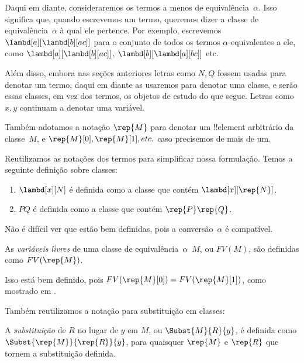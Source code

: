\documentclass[../../../include/open-logic-section]{subfiles}
\begin{document}

Daqui em diante, consideraremos os termos a menos de equivalência~$\alpha$.
Isso significa que, quando escrevemos um termo, queremos dizer a classe de
equivalência~$\alpha$ à qual ele pertence. Por exemplo, escrevemos
$\lambd[a][\lambd[b][a c]]$ para o conjunto de todos os termos
$\alpha$-equivalentes a ele, como $\lambd[a][\lambd[b][a c]]$,
$\lambd[b][\lambd[a][b c]]$ etc.

Além disso, embora nas seções anteriores letras como $N, Q$ fossem usadas
para denotar um termo, daqui em diante as usaremos para denotar uma classe, e
serão essas classes, em vez dos termos, os objetos de estudo do que segue.
Letras como $x, y$ continuam a denotar uma variável.

Também adotamos a notação $\rep{M}$ para denotar um !!{element} arbitrário da
classe~$M$, e $\rep{M}[0], \rep{M}[1], etc. $ caso precisemos de mais de um.

Reutilizamos as notações dos termos para simplificar nossa formulação. Temos
a seguinte definição sobre classes:
\begin{defn}
  \begin{enumerate}
  \item $\lambd[x][N]$ é definida como a classe que contém
    $\lambd[x][\rep{N}]$.
  \item $PQ$ é definida como a classe que contém $\rep{P}\rep{Q}$.
  \end{enumerate}
\end{defn}

Não é difícil ver que estão bem definidas, pois a conversão~$\alpha$ é
compatível.

\begin{defn} 
  As \emph{variáveis livres} de uma classe de equivalência~$\alpha$~$M$, ou
  $FV(M)$, são definidas como $FV(\rep{M})$.
\end{defn}

Isso está bem definido, pois $FV(\rep{M}[0]) = FV(\rep{M}[1])$, como mostrado
em .

Também reutilizamos a notação para substituição em classes:
\begin{defn} 
  A \emph{substituição} de $R$ no lugar de $y$ em $M$, ou $\Subst{M}{R}{y}$, é
  definida como $\Subst{\rep{M}}{\rep{R}}{y}$, para quaisquer $\rep{M}$ e
  $\rep{R}$ que tornem a substituição definida.
\end{defn}
\end{document}
